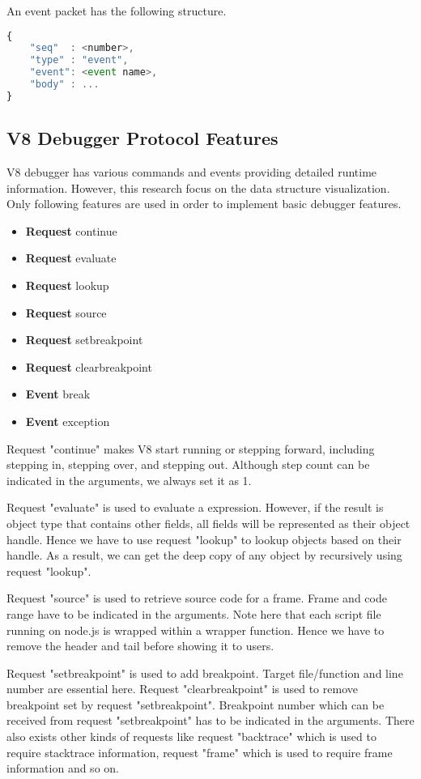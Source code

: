 An event packet has the following structure.

\begin{lstlisting}[language=JavaScript]
{
	"seq"  : <number>,
	"type" : "event",
	"event": <event name>,
	"body" : ...
}
\end{lstlisting}

\subsection {V8 Debugger Protocol Features}
V8 debugger has various commands and events providing detailed runtime information. However, this research focus on the data structure visualization. Only following features are used in order to implement basic debugger features.

\begin {itemize}
\item \textbf{Request} continue
\item \textbf{Request} evaluate
\item \textbf{Request} lookup
\item \textbf{Request} source
\item \textbf{Request} setbreakpoint
\item \textbf{Request} clearbreakpoint
\item \textbf{Event} break
\item \textbf{Event} exception
\end {itemize} 

Request "continue" makes V8 start running or stepping forward, including stepping in, stepping over, and stepping out. Although step count can be indicated in the arguments, we always set it as 1.

Request "evaluate" is used to evaluate a expression. However, if the result is object type that contains other fields, all fields will be represented as their object handle. Hence we have to use request "lookup" to lookup objects based on their handle. As a result, we can get the deep copy of any object by recursively using request "lookup".

Request "source" is used to retrieve source code for a frame. Frame and code range have to be indicated in the arguments. Note here that each script file running on node.js is wrapped within a wrapper function. Hence we have to remove the header and tail before showing it to users.

Request "setbreakpoint" is used to add breakpoint. Target file/function and line number are essential here. Request "clearbreakpoint" is used to remove breakpoint set by request "setbreakpoint". Breakpoint number which can be received from request "setbreakpoint" has to be indicated in the arguments. There also exists other kinds of requests like request "backtrace" which is used to require stacktrace information, request "frame" which is used to require frame information and so on.

